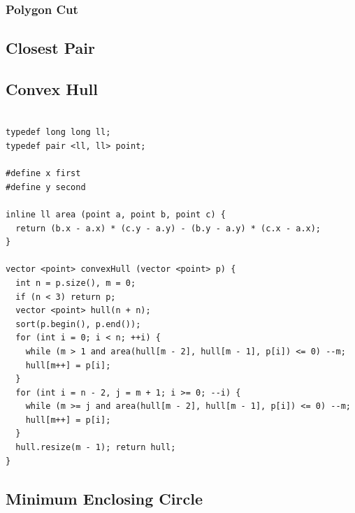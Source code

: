 \documentclass[9pt, landscape, a4paper,twosided]{extarticle}
\begin{document}
\begin{multicols*}{3}
\subsubsection{Polygon Cut}

\subsection{Closest Pair}

\subsection{Convex Hull}
\begin{verbatim}

typedef long long ll;
typedef pair <ll, ll> point;

#define x first
#define y second

inline ll area (point a, point b, point c) {
  return (b.x - a.x) * (c.y - a.y) - (b.y - a.y) * (c.x - a.x);
}

vector <point> convexHull (vector <point> p) {
  int n = p.size(), m = 0;
  if (n < 3) return p;
  vector <point> hull(n + n);
  sort(p.begin(), p.end());
  for (int i = 0; i < n; ++i) {
    while (m > 1 and area(hull[m - 2], hull[m - 1], p[i]) <= 0) --m;
    hull[m++] = p[i];
  }
  for (int i = n - 2, j = m + 1; i >= 0; --i) {
    while (m >= j and area(hull[m - 2], hull[m - 1], p[i]) <= 0) --m;
    hull[m++] = p[i];
  }
  hull.resize(m - 1); return hull;
}
\end{verbatim}

\subsection{Minimum Enclosing Circle}
\begin{verbatim}


\end{verbatim}
\end{multicols*}
\end{document}
